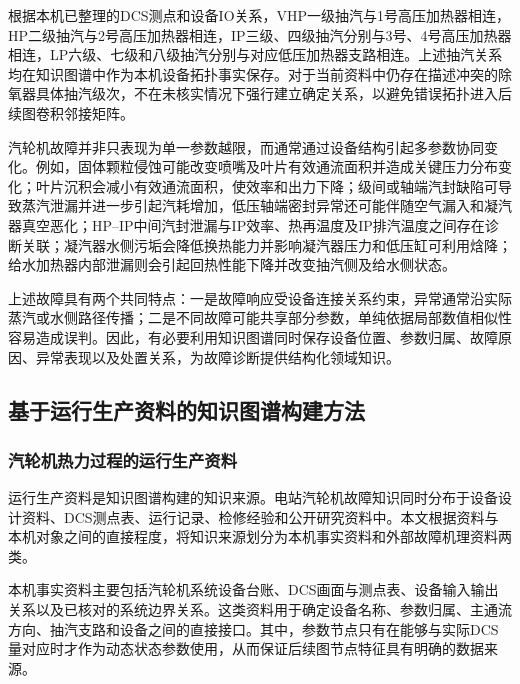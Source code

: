 根据本机已整理的DCS测点和设备IO关系，VHP一级抽汽与1号高压加热器相连，HP二级抽汽与2号高压加热器相连，IP三级、四级抽汽分别与3号、4号高压加热器相连，LP六级、七级和八级抽汽分别与对应低压加热器支路相连。上述抽汽关系均在知识图谱中作为本机设备拓扑事实保存。对于当前资料中仍存在描述冲突的除氧器具体抽汽级次，不在未核实情况下强行建立确定关系，以避免错误拓扑进入后续图卷积邻接矩阵。

汽轮机故障并非只表现为单一参数越限，而通常通过设备结构引起多参数协同变化。例如，固体颗粒侵蚀可能改变喷嘴及叶片有效通流面积并造成关键压力分布变化\cite{Kubiak2002TurbineDegradation}；叶片沉积会减小有效通流面积，使效率和出力下降\cite{Kubiak2002ScaleDeposit}；级间或轴端汽封缺陷可导致蒸汽泄漏并进一步引起汽耗增加，低压轴端密封异常还可能伴随空气漏入和凝汽器真空恶化\cite{ZhangHu2021FaultPropagationGNN}；HP--IP中间汽封泄漏与IP效率、热再温度及IP排汽温度之间存在诊断关联\cite{Xu2011HPIPLeakage}；凝汽器水侧污垢会降低换热能力并影响凝汽器压力和低压缸可利用焓降\cite{Li2016CondenserFouling,Medica2018CondenserCondition}；给水加热器内部泄漏则会引起回热性能下降并改变抽汽侧及给水侧状态\cite{Heo2012FWHLeakage,Barszcz2011FeedwaterHeater}。

上述故障具有两个共同特点：一是故障响应受设备连接关系约束，异常通常沿实际蒸汽或水侧路径传播；二是不同故障可能共享部分参数，单纯依据局部数值相似性容易造成误判。因此，有必要利用知识图谱同时保存设备位置、参数归属、故障原因、异常表现以及处置关系，为故障诊断提供结构化领域知识。

\subsection{基于运行生产资料的知识图谱构建方法}
\label{subsec:kg_construction_v4}

\subsubsection{汽轮机热力过程的运行生产资料}
\label{subsubsec:operation_materials_v4}

运行生产资料是知识图谱构建的知识来源。电站汽轮机故障知识同时分布于设备设计资料、DCS测点表、运行记录、检修经验和公开研究资料中。本文根据资料与本机对象之间的直接程度，将知识来源划分为本机事实资料和外部故障机理资料两类。

本机事实资料主要包括汽轮机系统设备台账、DCS画面与测点表、设备输入输出关系以及已核对的系统边界关系。这类资料用于确定设备名称、参数归属、主通流方向、抽汽支路和设备之间的直接接口。其中，参数节点只有在能够与实际DCS量对应时才作为动态状态参数使用，从而保证后续图节点特征具有明确的数据来源。


